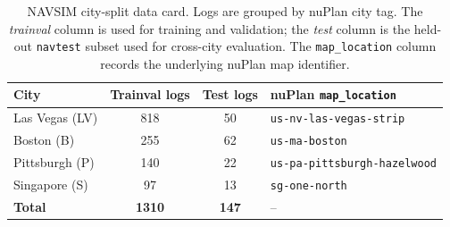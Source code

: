 \begin{table}[ht]
    \centering
    \caption[NAVSIM city-split data card.]{%
    NAVSIM city-split data card. Logs are grouped by nuPlan city tag. The \emph{trainval} column is used for training and validation; the \emph{test} column is the held-out \texttt{navtest} subset used for cross-city evaluation. The \texttt{map\_location} column records the underlying nuPlan map identifier.%
    }
    \label{tab:city-splits}
    \small
    \begin{tabular}{lccl}
    \toprule
    \textbf{City} & \textbf{Trainval logs} & \textbf{Test logs} & \textbf{nuPlan \texttt{map\_location}} \\
    \midrule
    Las Vegas (LV)   & 818 & 50 & \texttt{us-nv-las-vegas-strip} \\
    Boston (B)       & 255 & 62 & \texttt{us-ma-boston} \\
    Pittsburgh (P)   & 140 & 22 & \texttt{us-pa-pittsburgh-hazelwood} \\
    Singapore (S)    &  97 & 13 & \texttt{sg-one-north} \\
    \midrule
    \textbf{Total}   & \textbf{1310} & \textbf{147} & -- \\
    \bottomrule
    \end{tabular}
\end{table}
